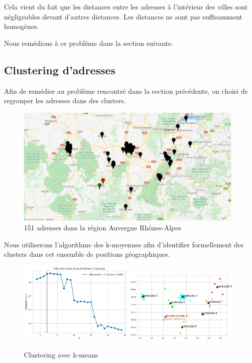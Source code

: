 \documentclass[12pt]{article}
\begin{document}
Cela vient du fait que les distances entre les adresses à l'intérieur des villes sont négligeables devant d'autres distances. Les distances ne sont pas suffisamment homogènes.

Nous remédions à ce problème dans la section suivante.

\newpage
\subsection{Clustering d'adresses}


Afin de remédier au problème rencontré dans la section précédente, on choisi de regrouper les adresses dans des clusters.


\begin{figure}[H]
\caption{151 adresses  dans la région Auvergne Rhônes-Alpes}
\begin{center}
\includegraphics[width=0.98\textwidth]{capture_adresses}
\end{center}
\end{figure}


Nous utiliserons l'algorithme des k-moyennes afin d'identifier formellement des clusters dans cet ensemble de positions géographiques.


\begin{figure}[H]
\caption{Clustering avec k-means}
\begin{center}
\includegraphics[width=0.49\textwidth]{kmeans-silhouette}
\includegraphics[width=0.49\textwidth]{kmeans-clustering}
\end{center}
\end{figure}
\end{document}
